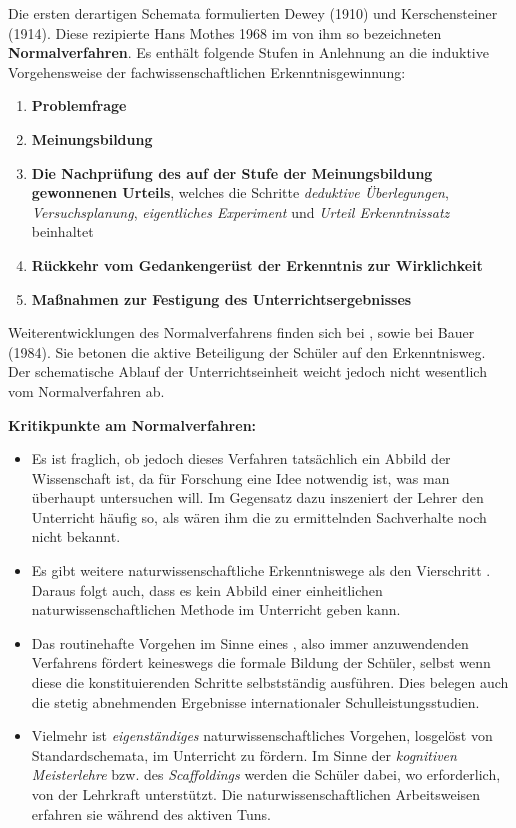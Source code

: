 \mip
Die ersten derartigen Schemata formulierten Dewey (1910) und Kerschensteiner (1914). Diese rezipierte Hans Mothes 1968 im von ihm so bezeichneten \textbf{Normalverfahren}. Es enthält folgende Stufen in Anlehnung an die induktive Vorgehensweise der fachwissenschaftlichen Erkenntnisgewinnung:

\begin{enumerate}
	\item {\bf Problemfrage}
	\item {\bf Meinungsbildung}
	\item {\bf Die Nachpr\"{u}fung des auf der Stufe der Meinungsbildung gewonnenen Urteils}, welches die Schritte \emph{deduktive \"{U}berlegungen}, \emph{Versuchsplanung},  \emph{eigentliches Experiment} und \emph{Urteil Erkenntnissatz} beinhaltet
	\item {\bf R\"{u}ckkehr vom Gedankenger\"{u}st der Erkenntnis zur Wirklichkeit}
	\item {\bf Ma\ss nahmen zur Festigung des Unterrichtsergebnisses}
\end{enumerate}

Weiterentwicklungen des Normalverfahrens finden sich bei \textcite{DuitHausslerKircher}, \textcite{Ploeger} sowie bei Bauer (1984). Sie betonen die aktive Beteiligung der Schüler auf den Erkenntnisweg. Der schematische Ablauf der Unterrichtseinheit weicht jedoch nicht wesentlich vom Normalverfahren ab.

\mip
{\bf Kritikpunkte am Normalverfahren:}
\begin{itemize}
	\item Es ist fraglich, ob jedoch dieses Verfahren tats\"{a}chlich ein Abbild der Wissenschaft ist, da f\"{u}r Forschung eine Idee notwendig ist, was man \"{u}berhaupt untersuchen will. Im Gegensatz dazu inszeniert der Lehrer den Unterricht h\"{a}ufig so, als w\"{a}ren ihm die zu ermittelnden Sachverhalte noch nicht bekannt.
	\item Es gibt weitere naturwissenschaftliche Erkenntniswege als den Vierschritt \textbf{}. Daraus folgt auch, dass es kein Abbild einer einheitlichen naturwissenschaftlichen Methode im Unterricht geben kann.
	\item Das routinehafte Vorgehen im Sinne eines , also immer anzuwendenden Verfahrens fördert keineswegs die formale Bildung der Schüler, selbst wenn diese die konstituierenden Schritte selbstständig ausführen. Dies belegen auch die stetig abnehmenden Ergebnisse internationaler Schulleistungsstudien.
	\item Vielmehr ist \emph{eigenständiges} naturwissenschaftliches Vorgehen, losgelöst von Standardschemata, im Unterricht zu fördern. Im Sinne der \emph{kognitiven Meisterlehre} bzw. des \emph{Scaffoldings} werden die Schüler dabei, wo erforderlich, von der Lehrkraft unterstützt. Die naturwissenschaftlichen Arbeitsweisen erfahren sie während des aktiven Tuns.
\end{itemize}



